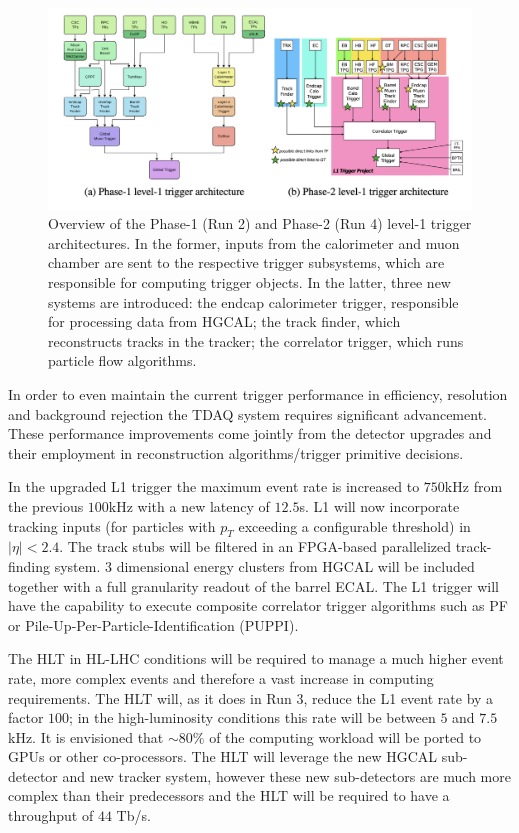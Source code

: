 \begin{figure}[t!]
    \centering
    \includegraphics[width=0.7\linewidth]{images/cms/l1t-phase2.png}
    \caption{Overview of the Phase-1 (Run 2) and Phase-2 (Run 4) level-1 trigger architectures. In the former, inputs from the calorimeter and muon chamber are sent to the respective trigger subsystems, which are responsible for computing trigger objects. In the latter, three new systems are introduced: the endcap calorimeter trigger, responsible for processing data from HGCAL; the track finder, which reconstructs tracks in the tracker; the correlator trigger, which runs particle flow algorithms\cite{bologna2019overviewcms}.}
    \label{fig:cms-L1}
\end{figure}

In order to even maintain the current trigger performance in efficiency, resolution and background rejection the TDAQ system requires significant advancement. These performance improvements come jointly from the detector upgrades and their employment in reconstruction algorithms/trigger primitive decisions.
\par
In the upgraded L1 trigger\cite{bologna2019overviewcms} the maximum event rate is increased to $750$kHz from the previous $100$kHz with a new latency of $12.5${\textmu}s. L1 will now incorporate tracking inputs (for particles with $p_T$ exceeding a configurable threshold) in $|\eta|<2.4$. The track stubs will be filtered in an FPGA-based parallelized track-finding system. $3$ dimensional energy clusters from HGCAL will be included together with a full granularity readout of the barrel ECAL. The L1 trigger will have the capability to execute composite correlator trigger algorithms such as PF\cite{petrucciani2019particlecms} or Pile-Up-Per-Particle-Identification (PUPPI)\cite{kreis2018particlecms,bertolini2014puppi}.
\vspace{12pt}

The HLT in HL-LHC conditions will be required to manage a much higher event rate, more complex events and therefore a vast increase in computing requirements\cite{collaboration2021cmshlt}. The HLT will, as it does in Run 3, reduce the L1 event rate by a factor $100$; in the high-luminosity conditions this rate will be between $5$ and $7.5$kHz.
It is envisioned that $\sim 80\%$ of the computing workload will be ported to GPUs or other co-processors\cite{morovic2023cms}. The HLT will leverage the new HGCAL sub-detector and new tracker system, however these new sub-detectors are much more complex than their predecessors and the HLT will be required to have a throughput of $44$ Tb/s\cite{tomei2022hltcms}.








